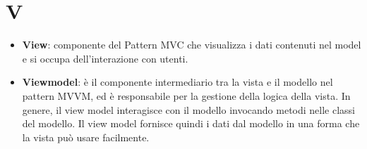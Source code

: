 \section{V}
\begin{itemize} 
	\item
	\textbf{View}: componente del Pattern MVC che visualizza i dati contenuti nel model e si occupa dell'interazione con utenti.
	\item
	\textbf{Viewmodel}: è il componente intermediario tra la vista e il modello nel pattern MVVM, ed è responsabile per la gestione della logica della vista. In genere, il view model interagisce con il modello invocando metodi nelle classi del modello. Il view model fornisce quindi i dati dal modello in una forma che la vista può usare facilmente.
\end{itemize}